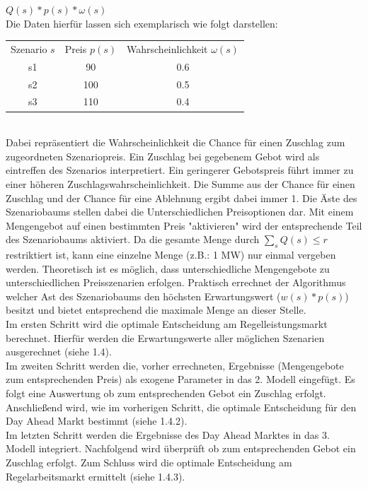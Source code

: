 $Q(s) * p(s) * \omega(s)$\\
Die Daten hierfür lassen sich exemplarisch wie folgt darstellen:\\
\begin{tabular}{c|c|c}
	Szenario $s$ & Preis $p(s)$ & Wahrscheinlichkeit $\omega(s)$ \\
	s1           & 90           & 0.6                            \\
	s2           & 100          & 0.5                            \\
	s3           & 110          & 0.4                            \\
\end{tabular}\\


Dabei repräsentiert die Wahrscheinlichkeit die Chance für einen Zuschlag zum zugeordneten Szenariopreis. Ein Zuschlag bei gegebenem Gebot wird als eintreffen des Szenarios interpretiert. Ein geringerer Gebotspreis führt immer zu einer höheren Zuschlagswahrscheinlichkeit. Die Summe aus der Chance für einen Zuschlag und der Chance für eine Ablehnung ergibt dabei immer 1. Die Äste des Szenariobaums stellen dabei die Unterschiedlichen Preisoptionen dar. Mit einem Mengengebot auf einen bestimmten Preis "aktivieren" wird der entsprechende Teil des Szenariobaums aktiviert. Da die gesamte Menge durch $\sum_s Q(s) \leq r$  restriktiert ist, kann eine einzelne Menge (z.B.: 1 MW) nur einmal vergeben werden. Theoretisch ist es möglich, dass unterschiedliche Mengengebote zu unterschiedlichen Preisszenarien erfolgen. Praktisch errechnet der Algorithmus welcher Ast des Szenariobaums den höchsten Erwartungswert ($w(s)*p(s)$) besitzt und bietet entsprechend die maximale Menge an dieser Stelle. \\

Im ersten Schritt wird die optimale Entscheidung am Regelleistungsmarkt berechnet. Hierfür werden die Erwartungswerte aller möglichen Szenarien ausgerechnet (siehe 1.4).\\

Im zweiten Schritt werden die, vorher errechneten, Ergebnisse (Mengengebote zum entsprechenden Preis) als exogene Parameter in das 2. Modell eingefügt. Es folgt eine Auswertung ob zum entsprechenden Gebot ein Zuschlag erfolgt. Anschließend wird, wie im vorherigen Schritt, die optimale Entscheidung für den Day Ahead Markt bestimmt (siehe 1.4.2).\\

Im letzten Schritt werden die Ergebnisse des Day Ahead Marktes in das 3. Modell integriert. Nachfolgend wird überprüft ob zum entsprechenden Gebot ein Zuschlag erfolgt. Zum Schluss wird die optimale Entscheidung am Regelarbeitsmarkt ermittelt (siehe 1.4.3).\\






